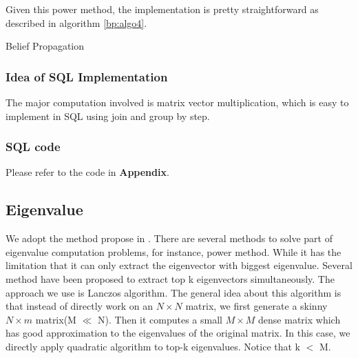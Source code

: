 Given this power method, the implementation is pretty straightforward as described in algorithm \ref{bp:algo4}.
\begin{algorithm}
\caption{Belief Propagation}
\begin{algorithmic}
\REPEAT
{}
\end{algorithmic}
\label{bp:algo4}
\end{algorithm}

\subsubsection{Idea of SQL Implementation}
The major computation involved is matrix vector multiplication, which is easy to implement in SQL using join and group by step.

\subsubsection{SQL code}
Please refer to the code in {\bf Appendix}.

\subsection{Eigenvalue}
We adopt the method propose in \cite{kang2011spectral}. There are several methods to solve part of eigenvalue computation problems, for instance, power method\cite{langville2004deeper}. While it has the limitation that it can only extract the eigenvector with biggest eigenvalue. Several method have been proposed to extract top k eigenvectors simultaneously. The approach we use is Lanczos algorithm\cite{lanczos1950iteration}. The general idea about this algorithm is that instead of directly work on an $N \times N$ matrix, we first generate a skinny $N \times m$ matrix(M $\ll$ N). Then it computes a small $M \times M$ dense matrix which has good approximation to the eigenvalues of the original matrix. In this case, we directly apply quadratic algorithm to top-k eigenvalues. Notice that k $<$ M.

